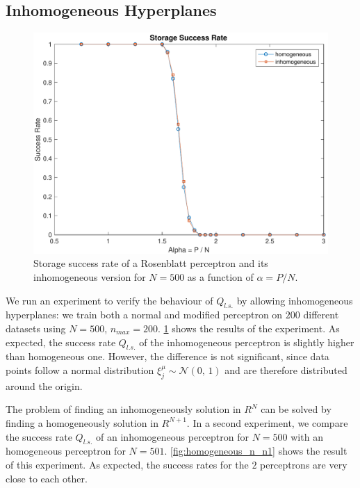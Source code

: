 \subsection{Inhomogeneous Hyperplanes}
\label{subsec:homogeneous}
\begin{figure}[t]
	\centering
	\includegraphics[width=\columnwidth]{figures/homogeneous}
    \caption{Storage success rate of a Rosenblatt perceptron and its inhomogeneous version for $N = 500$ as a function of $\alpha = P / N$.}
	\label{fig:homogeneous}
\end{figure}
We run an experiment to verify the behaviour of $Q_{l.s.}$ by allowing inhomogeneous hyperplanes:
we train both a normal and modified perceptron on $200$ different datasets using $N = 500$, $n_{max} = 200$.
\cref{fig:homogeneous} shows the results of the experiment.
As expected, the success rate $Q_{l.s.}$ of the inhomogeneous perceptron is slightly higher than homogeneous one.
However, the difference is not significant, since data points follow a normal distribution $\xi^\mu_j \sim \mathcal{N}(0,\,1)$ and are therefore distributed around the origin.

The problem of finding an inhomogeneously solution in $R^{N}$ can be solved by finding a homogeneously solution in $R^{N + 1}$.
In a second experiment, we compare the success rate $Q_{l.s.}$ of an inhomogeneous perceptron for $N = 500$ with an homogeneous perceptron for $N = 501$.
\cref{fig:homogeneous_n_n1} shows the result of this experiment.
As expected, the success rates for the $2$ perceptrons are very close to each other.

